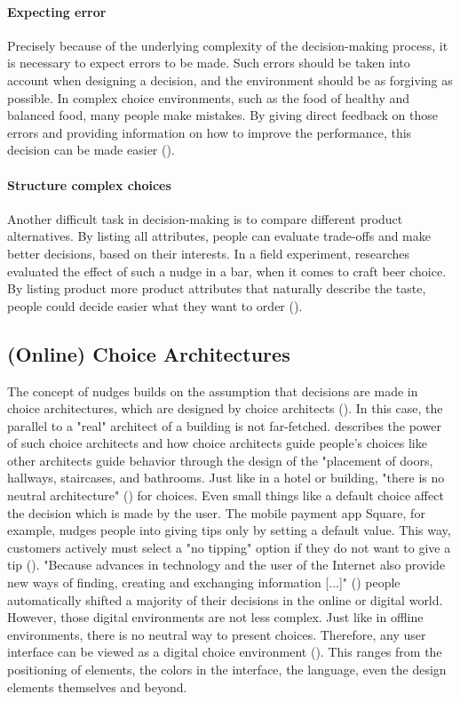 \paragraph{Expecting error}
Precisely because of the underlying complexity of the decision-making process, it is necessary to expect errors to be made. Such errors should be taken into account when designing a decision, and the environment should be as forgiving as possible. In complex choice environments, such as the food of healthy and balanced food, many people make mistakes. By giving direct feedback on those errors and providing information on how to improve the performance, this decision can be made easier (\cite{guthrie_nudging_2015}).
\paragraph{Structure complex choices}
Another difficult task in decision-making is to compare different product alternatives. By listing all attributes, people can evaluate trade-offs and make better decisions, based on their interests. In a field experiment, researches evaluated the effect of such a nudge in a bar, when it comes to craft beer choice. By listing product more product attributes that naturally describe the taste, people could decide easier what they want to order (\cite{malone_excessive_2017}).


\subsection{(Online) Choice Architectures}
The concept of nudges builds on the assumption that decisions are made in choice architectures, which are designed by choice architects (\cite{thaler_nudge:_2009}). In this case, the parallel to a "real" architect of a building is not far-fetched. \cite{johnson_beyond_2012} describes the power of such choice architects and how choice architects guide people's choices like other architects guide behavior through the design of the "placement of doors, hallways, staircases, and bathrooms. Just like in a hotel or building, "there is no neutral architecture" (\cite[p.488]{johnson_beyond_2012}) for choices. Even small things like a default choice affect the decision which is made by the user. The mobile payment app Square, for example, nudges people into giving tips only by setting a default value. This way, customers actively must select a "no tipping" option if they do not want to give a tip (\cite{weinmann_digital_2016}). "Because advances in technology and the user of the Internet also provide new ways of finding, creating and exchanging information [...]" (\cite[p.609]{broniarczyk_decision_2014}) people automatically shifted a majority of their decisions in the online or digital world. However, those digital environments are not less complex. Just like in offline environments, there is no neutral way to present choices. Therefore, any user interface can be viewed as a digital choice environment (\cite{schneider_digital_2018}). This ranges from the positioning of elements, the colors in the interface, the language, even the design elements themselves and beyond.

